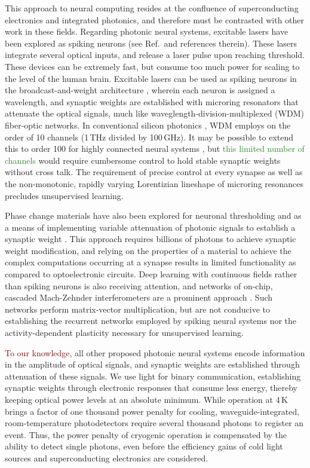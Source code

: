 \documentclass[twocolumn]{article}
\newcommand{\onlinecite}[1]{\hspace{-1 ex} \nocite{#1}\citenum{#1}}
\begin{document}
{This approach to neural computing resides at the confluence of superconducting electronics and integrated photonics, and therefore must be contrasted with other work in these fields. Regarding photonic neural systems, excitable lasers have been explored as spiking neurons (see Ref.\,\onlinecite{prsh2017} and references therein). These lasers integrate several optical inputs, and release a laser pulse upon reaching threshold. These devices can be extremely fast, but consume too much power for scaling to the level of the human brain. Excitable lasers can be used as spiking neurons in the broadcast-and-weight architecture \cite{tana20142}, wherein each neuron is assigned a wavelength, and synaptic weights are established with microring resonators that attenuate the optical signals, much like  waveglength-division-multiplexed (WDM) fiber-optic networks. In conventional silicon photonics \textcolor{ForestGreen}{\cite{li2005}}, WDM employs on the order of 10 channels (1\,THz divided by 100\,GHz). It may be possible to extend this to order 100 for highly connected neural systems \cite{prsh2011,tana20142}, but \textcolor{ForestGreen}{this limited number of channels} would require cumbersome control to hold stable synaptic weights without cross talk. The requirement of precise control at every synapse as well as the non-monotonic, rapidly varying Lorentizian lineshape of microring resonances precludes unsupervised learning. 

Phase change materials have also been explored for neuronal thresholding \cite{chsa2018} and as a means of implementing variable attenuation of photonic signals to establish a synaptic weight \cite{chri2017}. This approach requires billions of photons to achieve synaptic weight modification, and relying on the properties of a material to achieve the complex computations occurring at a synapse results in limited functionality as compared to optoelectronic circuits. Deep learning with continuous fields rather than spiking neurons is also receiving attention, and networks of on-chip, cascaded Mach-Zehnder interferometers are a prominent approach \cite{shha2016}. Such networks perform matrix-vector multiplication, but are not conducive to establishing the recurrent networks employed by spiking neural systems nor the activity-dependent plasticity necessary for unsupervised learning. 

\textcolor{Maroon}{To our knowledge}, all other proposed photonic neural systems encode information in the amplitude of optical signals, and synaptic weights are established through attenuation of these signals. We use light for binary communication, establishing synaptic weights through electronic responses that consume less energy, thereby keeping optical power levels at an absolute minimum. While operation at 4\,K brings a factor of one thousand power penalty for cooling, waveguide-integrated, room-temperature photodetectors require several thousand photons to register an event. Thus, the power penalty of cryogenic operation is compensated by the ability to detect single photons, even before the efficiency gains of cold light sources and superconducting electronics are considered.

}
\end{document}
